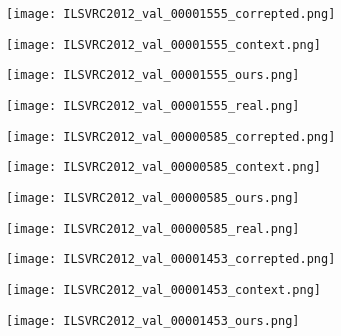 \documentclass{article}
\begin{document}
\begin{figure}[!t]
\captionsetup[subfigure]{labelformat=empty}
\centering
 \begin{subfigure}[b]{0.22\textwidth}
    \texttt{[image: ILSVRC2012\_val\_00001555\_correpted.png]}%
    \label{fig_first_case}
\end{subfigure}
 \begin{subfigure}[b]{0.22\textwidth}
    \texttt{[image: ILSVRC2012\_val\_00001555\_context.png]}%
    \label{fig_first_case}
\end{subfigure}
 \begin{subfigure}[b]{0.22\textwidth}
    \texttt{[image: ILSVRC2012\_val\_00001555\_ours.png]}%
    \label{fig_first_case}
\end{subfigure}
 \begin{subfigure}[b]{0.22\textwidth}
    \texttt{[image: ILSVRC2012\_val\_00001555\_real.png]}%
    \label{fig_first_case}
\end{subfigure}
 \begin{subfigure}[b]{0.22\textwidth}
    \texttt{[image: ILSVRC2012\_val\_00000585\_correpted.png]}%
    \label{fig_first_case}
\end{subfigure}
 \begin{subfigure}[b]{0.22\textwidth}
    \texttt{[image: ILSVRC2012\_val\_00000585\_context.png]}%
    \label{fig_first_case}
\end{subfigure}
 \begin{subfigure}[b]{0.22\textwidth}
    \texttt{[image: ILSVRC2012\_val\_00000585\_ours.png]}%
    \label{fig_first_case}
\end{subfigure}
 \begin{subfigure}[b]{0.22\textwidth}
    \texttt{[image: ILSVRC2012\_val\_00000585\_real.png]}%
    \label{fig_first_case}
\end{subfigure}
 \begin{subfigure}[b]{0.22\textwidth}
    \texttt{[image: ILSVRC2012\_val\_00001453\_correpted.png]}%
    \label{fig_first_case}
\end{subfigure}
 \begin{subfigure}[b]{0.22\textwidth}
    \texttt{[image: ILSVRC2012\_val\_00001453\_context.png]}%
    \label{fig_first_case}
\end{subfigure}
 \begin{subfigure}[b]{0.22\textwidth}
    \texttt{[image: ILSVRC2012\_val\_00001453\_ours.png]}%

\end{subfigure}
\end{figure}
\end{document}
